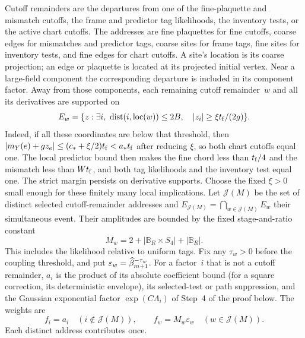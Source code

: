 Cutoff remainders are the departures from one of the fine-plaquette and mismatch cutoffs, the frame and predictor tag likelihoods, the inventory tests, or the active chart cutoffs. The addresses are fine plaquettes for fine cutoffs, coarse edges for mismatches and predictor tags, coarse sites for frame tags, fine sites for inventory tests, and fine edges for chart cutoffs. A site's location is its coarse projection; an edge or plaquette is located at its projected initial vertex. Near a large-field component the corresponding departure is included in its component factor. Away from those components, each remaining cutoff remainder~$w$ and all its derivatives are supported on
\begin{equation*}
E_w=\{z:\exists i,\ \operatorname{dist}(i,\operatorname{loc}(w))\le2B,
\quad |z_i|\ge\xi t_{\rm f}/(2g)\}.
\end{equation*}
Indeed, if all these coordinates are below that threshold, then $|m_Y(e)+gz_e|\le(c_*+\xi/2)t_{\rm f}<a_*t_{\rm f}$ after reducing $\xi$, so both chart cutoffs equal one. The local predictor bound then makes the fine chord less than $t_{\rm f}/4$ and the mismatch less than $Wt_{\rm f}$, and both tag likelihoods and the inventory test equal one. The strict margin persists on derivative supports. Choose the fixed $\xi>0$ small enough for these finitely many local implications. Let $\mathcal J(M)$ be the set of distinct selected cutoff-remainder addresses and $E_{\mathcal J(M)}=\bigcap_{w\in\mathcal J(M)}E_w$ their simultaneous event. Their amplitudes are bounded by the fixed stage-and-ratio constant
\begin{equation*}
M_w=2+|\mathbb B_R\times S_4|+|\mathbb B_R|.
\end{equation*}
This includes the likelihood relative to uniform tags. Fix any $\tau_w>0$ before the coupling threshold, and put $\varepsilon_w=\widehat{\beta}_{m+1}^{-\tau_w}$. For a factor~$i$ that is not a cutoff remainder, $a_i$ is the product of its absolute coefficient bound (for a square correction, its deterministic envelope), its selected-test or path suppression, and the Gaussian exponential factor $\exp(C\Lambda_i)$ of Step~4 of the proof below. The weights are
\begin{equation*}
f_i=a_i\quad(i\notin\mathcal J(M)),\qquad
f_w=M_w\varepsilon_w\quad(w\in\mathcal J(M)).
\end{equation*}
Each distinct address contributes once.

